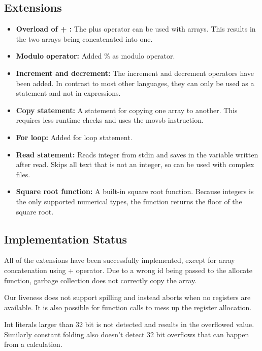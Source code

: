\documentclass{article}
\begin{document}
\subsection{Extensions}
\begin{itemize}
    \item[] \textbf{ Overload of + : } The plus operator can be used with arrays. This results in the two arrays being concatenated into one.
    \item[] \textbf{ Modulo operator: } Added \% as modulo operator.
    \item[] \textbf{ Increment and decrement: } The increment and decrement operators have been added. In contrast to most other languages, they can only be used as a statement and not in expressions.
    \item[] \textbf{ Copy statement: } A statement for copying one array to another. This requires less runtime checks and uses the movsb instruction.
    \item[] \textbf{ For loop: } Added for loop statement.
    \item[] \textbf{ Read statement: } Reads integer from stdin and saves in the variable written after read. Skips all text that is not an integer, so can be used with complex files.
    \item[] \textbf{ Square root function: } A built-in square root function. Because integers is the only supported numerical types, the function returns the floor of the square root.
\end{itemize}



\subsection{Implementation Status}
All of the extensions have been successfully implemented, except for array concatenation using + operator. Due to a wrong id being passed to the allocate function, garbage collection does not correctly copy the array. 

Our liveness does not support spilling and instead aborts when no registers are available. It is also possible for function calls to mess up the register allocation. 

Int literals larger than 32 bit is not detected and results in the overflowed value. Similarly constant folding also doesn't detect 32 bit overflows that can happen from a calculation. 
\end{document}

